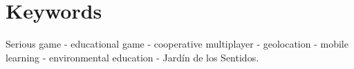 \vspace{1cm}
\section*{Keywords}
Serious game - educational game - cooperative multiplayer - geolocation - mobile learning - environmental education - Jardín de los Sentidos.

\clearpage

\tableofcontents
\clearpage

\listoffigures
\clearpage

\listoftables
\clearpage

